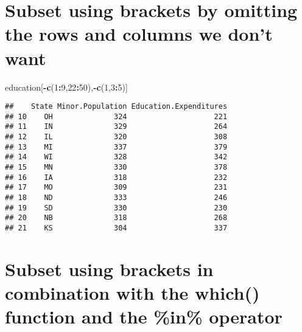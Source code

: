 \documentclass[]{book}
\newenvironment{Shaded}{\begin{snugshade}}{\end{snugshade}}
\newcommand{\DecValTok}[1]{\textcolor[rgb]{0.00,0.00,0.81}{#1}}
\newcommand{\KeywordTok}[1]{\textcolor[rgb]{0.13,0.29,0.53}{\textbf{#1}}}
\newcommand{\NormalTok}[1]{#1}
\newcommand{\OperatorTok}[1]{\textcolor[rgb]{0.81,0.36,0.00}{\textbf{#1}}}
\newcommand{\StringTok}[1]{\textcolor[rgb]{0.31,0.60,0.02}{#1}}
\begin{document}
\hypertarget{subset-using-brackets-by-omitting-the-rows-and-columns-we-dont-want}{%
\section{Subset using brackets by omitting the rows and columns we don't want}\label{subset-using-brackets-by-omitting-the-rows-and-columns-we-dont-want}}

\begin{Shaded}
\begin{Highlighting}[]
\NormalTok{education[}\OperatorTok{-}\KeywordTok{c}\NormalTok{(}\DecValTok{1}\OperatorTok{:}\DecValTok{9}\NormalTok{,}\DecValTok{22}\OperatorTok{:}\DecValTok{50}\NormalTok{),}\OperatorTok{-}\KeywordTok{c}\NormalTok{(}\DecValTok{1}\NormalTok{,}\DecValTok{3}\OperatorTok{:}\DecValTok{5}\NormalTok{)]}
\end{Highlighting}
\end{Shaded}

\begin{verbatim}
##    State Minor.Population Education.Expenditures
## 10    OH              324                    221
## 11    IN              329                    264
## 12    IL              320                    308
## 13    MI              337                    379
## 14    WI              328                    342
## 15    MN              330                    378
## 16    IA              318                    232
## 17    MO              309                    231
## 18    ND              333                    246
## 19    SD              330                    230
## 20    NB              318                    268
## 21    KS              304                    337
\end{verbatim}

\hypertarget{subset-using-brackets-in-combination-with-the-which-function-and-the-in-operator}{%
\section{Subset using brackets in combination with the which() function and the \%in\% operator}\label{subset-using-brackets-in-combination-with-the-which-function-and-the-in-operator}}

\begin{Shaded}
\end{Shaded}
\end{document}
